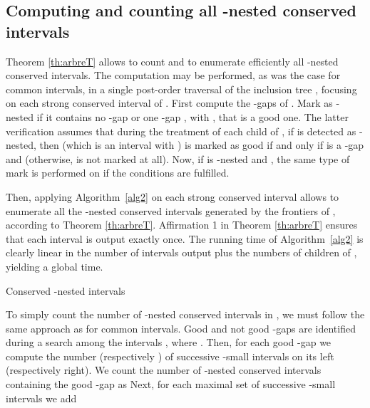 \documentclass{article}
\begin{document}
\subsection{Computing and counting all -nested conserved intervals}
\label{sect:computingconserved}

Theorem \ref{th:arbreT} allows to count and to enumerate efficiently all
-nested conserved intervals. The computation may be performed, as was
the case for common intervals, in a single post-order traversal of the inclusion tree , 
focusing on each strong conserved interval  of . First compute the -gaps of . 
Mark  as -nested if it contains no -gap or one -gap , with , 
that is a good one. The latter verification assumes that during the treatment of each child  of
, if  is detected as -nested, then  (which is an interval  with  
) is marked as good if and only if  is a -gap and 
(otherwise,  is not marked at all). Now, if  is -nested and , 
the same type of mark is performed on  if the conditions are fulfilled.
 
Then, applying Algorithm~\ref{alg2} on each strong conserved interval
 allows to enumerate all the -nested conserved intervals generated by the
frontiers of  , according to Theorem \ref{th:arbreT}. Affirmation 1 in Theorem \ref{th:arbreT}
ensures that each interval is output exactly once.
The running time of Algorithm~\ref{alg2} is clearly linear in the number of intervals output plus
the numbers of children of , yielding a global  time.

\begin{algorithm}[h!]
\dontprintsemicolon
\caption{Conserved -nested intervals \label{alg2}}

\end{algorithm}

To simply count the number of -nested conserved intervals in , we must follow the same
approach as for common intervals. Good and not good -gaps are identified during a search
among the intervals , where  . Then, for
each good -gap we compute the number  (respectively ) of successive
-small intervals  on its left (respectively right). We count
the number of -nested conserved intervals containing the good -gap as  
 Next, for each maximal set of successive -small intervals 
 we add
\end{document}
